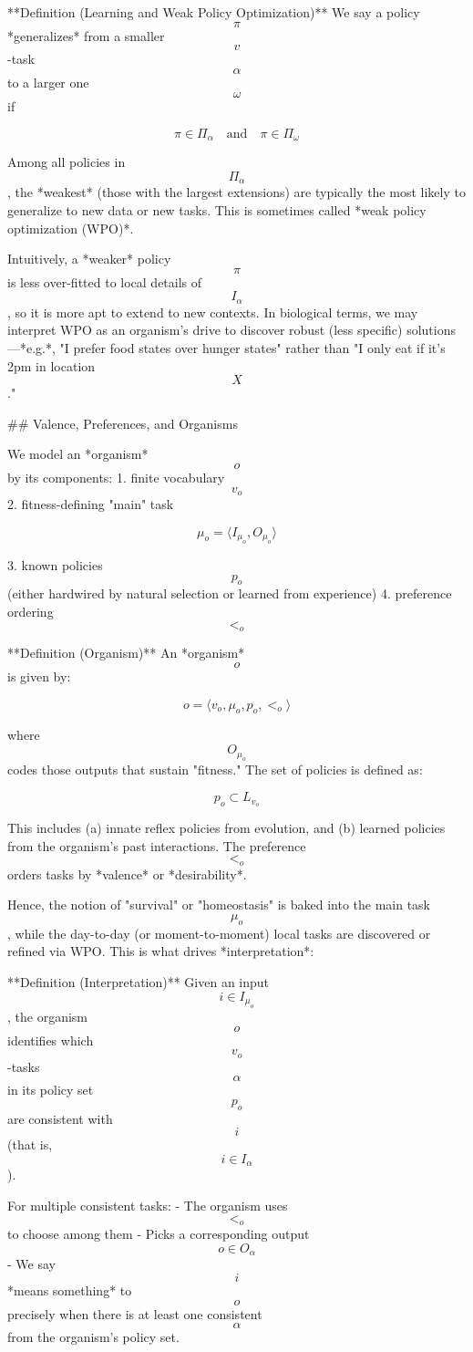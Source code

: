 **Definition (Learning and Weak Policy Optimization)**
We say a policy $$\pi$$ *generalizes* from a smaller $$v$$-task $$\alpha$$ to a larger one $$\omega$$ if 

$$
   \pi \in \Pi_\alpha \quad\text{and}\quad \pi \in \Pi_\omega
$$

Among all policies in $$\Pi_\alpha$$, the *weakest* (those with the largest extensions) are typically the most likely to generalize to new data or new tasks. This is sometimes called *weak policy optimization (WPO)*.

Intuitively, a *weaker* policy $$\pi$$ is less over-fitted to local details of $$I_\alpha$$, so it is more apt to extend to new contexts. In biological terms, we may interpret WPO as an organism's drive to discover robust (less specific) solutions—*e.g.*, "I prefer food states over hunger states" rather than "I only eat if it's 2pm in location $$X$$."

## Valence, Preferences, and Organisms

We model an *organism* $$o$$ by its components:
1. finite vocabulary $$v_o$$
2. fitness-defining "main" task

$$\mu_o = \langle I_{\mu_o}, O_{\mu_o} \rangle$$

3. known policies $$p_o$$ (either hardwired by natural selection or learned from experience)
4. preference ordering $$<_o$$

**Definition (Organism)**
An *organism* $$o$$ is given by:

$$
   o = \langle v_o, \mu_o, p_o, <_o \rangle
$$

where $$O_{\mu_o}$$ codes those outputs that sustain "fitness." The set of policies is defined as:

$$
   p_o \subset L_{v_o}
$$

This includes (a) innate reflex policies from evolution, and (b) learned policies from the organism's past interactions. The preference $$<_o$$ orders tasks by *valence* or *desirability*.

Hence, the notion of "survival" or "homeostasis" is baked into the main task $$\mu_o$$, while the day-to-day (or moment-to-moment) local tasks are discovered or refined via WPO. This is what drives *interpretation*:

**Definition (Interpretation)**
Given an input $$i \in I_{\mu_o}$$, the organism $$o$$ identifies which $$v_o$$-tasks $$\alpha$$ in its policy set $$p_o$$ are consistent with $$i$$ (that is, $$i \in I_{\alpha}$$). 

For multiple consistent tasks:
- The organism uses $$<_o$$ to choose among them
- Picks a corresponding output $$o \in O_{\alpha}$$
- We say $$i$$ *means something* to $$o$$ precisely when there is at least one consistent $$\alpha$$ from the organism's policy set.

